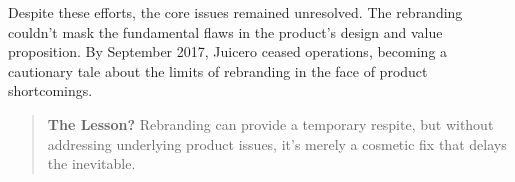 \begin{tcolorbox}[colback=blue!5!white, colframe=blue!50!black,
  title={Historical Sidebar: Juicero — When Rebranding Couldn't Squeeze Out Success}]
\medskip

Despite these efforts, the core issues remained unresolved. The rebranding couldn't mask the fundamental flaws in the product's design and value proposition. By September 2017, Juicero ceased operations, becoming a cautionary tale about the limits of rebranding in the face of product shortcomings.

\medskip

\begin{quote}
\textbf{The Lesson?} Rebranding can provide a temporary respite, but without addressing underlying product issues, it's merely a cosmetic fix that delays the inevitable.
\end{quote}

\end{tcolorbox}
